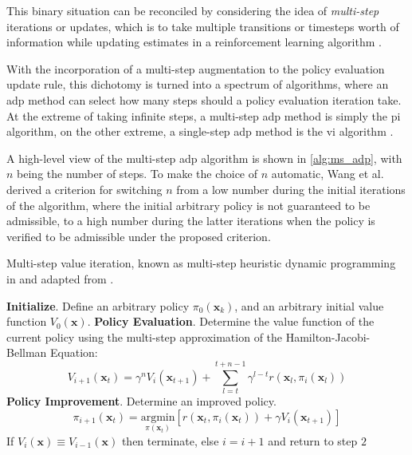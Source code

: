 \documentclass[../report.tex]{subfiles}
\begin{document}
This binary situation can be reconciled by considering the idea of \textit{multi-step} iterations or updates, which is to take multiple transitions or timesteps worth of information while updating estimates in a reinforcement learning algorithm \cite{intro_rl}.

With the incorporation of a multi-step augmentation to the policy evaluation update rule, this dichotomy is turned into a spectrum of algorithms, where an \ac{adp} method can select how many steps should a policy evaluation iteration take. At the extreme of taking infinite steps, a multi-step \ac{adp} method is simply the \ac{pi} algorithm, on the other extreme, a single-step \ac{adp} method is the \ac{vi} algorithm \cite{mshdp_og}.

A high-level view of the multi-step \ac{adp} algorithm is shown in \autoref{alg:ms_adp}, with $n$ being the number of steps. To make the choice of $n$ automatic, Wang et al. \cite{mshdp_new} derived a criterion for switching $n$ from a low number during the initial iterations of the algorithm, where the initial arbitrary policy is not guaranteed to be admissible, to a high number during the latter iterations when the policy is verified to be admissible under the proposed criterion. 

\begin{algorithm}[H]
	\caption{Multi-step value iteration, known as multi-step heuristic dynamic programming in and adapted from \cite{mshdp_og}.} \label{alg:ms_adp}
	\begin{algorithmic}[1]
        \State \textbf{Initialize}. Define an arbitrary policy $\pi_0(\mathbf{x}_k)$, and an arbitrary initial value function $V_0(\mathbf{x})$.
        \State \textbf{Policy Evaluation}. Determine the value function of the current policy using the multi-step approximation of the Hamilton-Jacobi-Bellman Equation:
        \begin{equation}\label{eq:adp_poli_eval_msvi}
            V_{i+1}(\mathbf{x}_t) =  \gamma^{n} V_i(\mathbf{x}_{t+1}) + \sum\limits_{l=t}^{t+n-1}\gamma^{l-t}r(\mathbf{x}_l, \pi_i(\mathbf{x}_l))
        \end{equation}
        \State \textbf{Policy Improvement}. Determine an improved policy. 
        {\myfont
        \begin{equation}
            \pi_{i+1}(\mathbf{x}_t) = \underset{\pi(\mathbf{x}_t)}{\text{argmin}}[r(\mathbf{x}_t, \pi_i(\mathbf{x}_t)) + \gamma V_i(\mathbf{x}_{t+1})]
        \end{equation}}
        \State If $V_i(\mathbf{x}) \equiv V_{i-1}(\mathbf{x})$ then terminate, else $i = i+1$ and return to step $2$
	\end{algorithmic} 
\end{algorithm}
\end{document}
